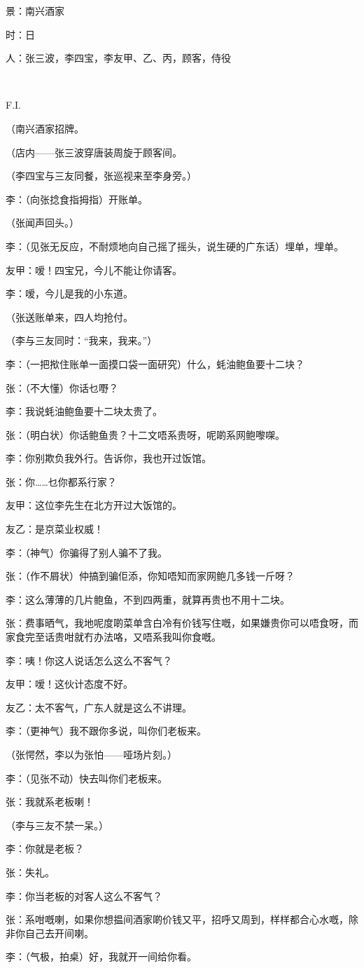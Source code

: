 \par 景：南兴酒家
\par 时：日
\par 人：张三波，李四宝，李友甲、乙、丙，顾客，侍役
\par  
\par F.I.
\par （南兴酒家招牌。
\par （店内——张三波穿唐装周旋于顾客间。
\par （李四宝与三友同餐，张巡视来至李身旁。）
\par 李：（向张捻食指拇指）开账单。
\par （张闻声回头。）
\par 李：（见张无反应，不耐烦地向自己摇了摇头，说生硬的广东话）埋单，埋单。
\par 友甲：嗳！四宝兄，今儿不能让你请客。
\par 李：嗳，今儿是我的小东道。
\par （张送账单来，四人均抢付。
\par （李与三友同时：“我来，我来。”）
\par 李：（一把揿住账单一面摸口袋一面研究）什么，蚝油鲍鱼要十二块？
\par 张：（不大懂）你话乜嘢？
\par 李：我说蚝油鲍鱼要十二块太贵了。
\par 张：（明白状）你话鲍鱼贵？十二文唔系贵呀，呢啲系网鲍嚟㗎。
\par 李：你别欺负我外行。告诉你，我也开过饭馆。
\par 张：你……乜你都系行家？
\par 友甲：这位李先生在北方开过大饭馆的。
\par 友乙：是京菜业权威！
\par 李：（神气）你骗得了别人骗不了我。
\par 张：（作不屑状）仲搞到骗佢添，你知唔知而家网鲍几多钱一斤呀？
\par 李：这么薄薄的几片鲍鱼，不到四两重，就算再贵也不用十二块。
\par 张：费事晒气，我地呢度啲菜单含白冷有价钱写住嘅，如果嫌贵你可以唔食呀，而家食完至话贵咁就冇办法咯，又唔系我叫你食嘅。
\par 李：咦！你这人说话怎么这么不客气？
\par 友甲：嗳！这伙计态度不好。
\par 友乙：太不客气，广东人就是这么不讲理。
\par 李：（更神气）我不跟你多说，叫你们老板来。
\par （张愕然，李以为张怕——哑场片刻。）
\par 李：（见张不动）快去叫你们老板来。
\par 张：我就系老板喇！
\par （李与三友不禁一呆。）
\par 李：你就是老板？
\par 张：失礼。
\par 李：你当老板的对客人这么不客气？
\par 张：系咁嘅喇，如果你想揾间酒家啲价钱又平，招呼又周到，样样都合心水嘅，除非你自己去开间喇。
\par 李：（气极，拍桌）好，我就开一间给你看。
\par {}




